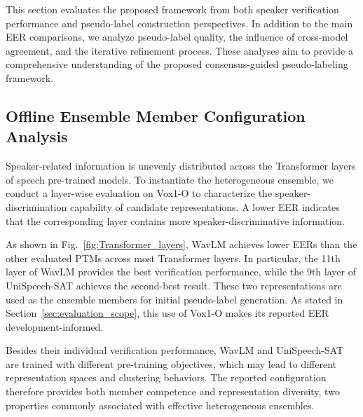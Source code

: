 \documentclass[journal]{IEEEtran}
\begin{document}
This section evaluates the proposed framework from both speaker verification performance and pseudo-label construction perspectives.
In addition to the main EER comparisons, we analyze pseudo-label quality, the influence of cross-model agreement, and the iterative refinement process.
These analyses aim to provide a comprehensive understanding of the proposed consensus-guided pseudo-labeling framework.

\subsection{Offline Ensemble Member Configuration Analysis}

Speaker-related information is unevenly distributed across the Transformer layers of speech pre-trained models.
To instantiate the heterogeneous ensemble, we conduct a layer-wise evaluation on Vox1-O to characterize the speaker-discrimination capability of candidate representations.
A lower EER indicates that the corresponding layer contains more speaker-discriminative information.

As shown in Fig.~\ref{fig:Transformer_layers}, WavLM achieves lower EERs than the other evaluated PTMs across most Transformer layers.
In particular, the 11th layer of WavLM provides the best verification performance, while the 9th layer of UniSpeech-SAT achieves the second-best result.
These two representations are used as the ensemble members for initial pseudo-label generation. As stated in Section~\ref{sec:evaluation_scope}, this use of Vox1-O makes its reported EER development-informed.

Besides their individual verification performance, WavLM and UniSpeech-SAT are trained with different pre-training objectives, which may lead to different representation spaces and clustering behaviors. The reported configuration therefore provides both member competence and representation diversity, two properties commonly associated with effective heterogeneous ensembles.
\end{document}
